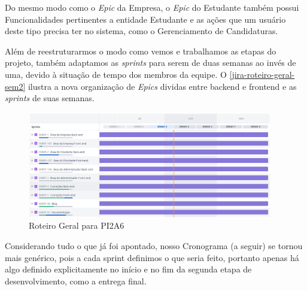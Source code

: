 Do mesmo modo como o \textit{Epic} da Empresa, o \textit{Epic} do Estudante também possui Funcionalidades pertinentes a entidade Estudante e as ações que um usuário deste tipo precisa ter no sistema, como o Gerenciamento de Candidaturas.

Além de reestruturarmos o modo como vemos e trabalhamos as etapas do projeto, também adaptamos as \textit{\glspl{sprint}} para serem de duas semanas ao invés de uma, devido à situação de tempo dos membros da equipe. O \autoref{jira-roteiro-geral-sem2} ilustra a nova organização de \textit{Epics} dividas entre \gls{backend} e \gls{frontend} e as \textit{\glspl{sprint}} de suas semanas.

\begin{figure}[H]
	\centering
	\caption{\label{jira-roteiro-geral-sem2}Roteiro Geral para PI2A6}
	\includegraphics[width=0.95\textwidth]{../imagens/jira-roteiro-geral-sem2.png}
\end{figure}

Considerando tudo o que já foi apontado, nosso Cronograma (a seguir) se tornou mais genérico, pois a cada \gls{sprint} definimos o que seria feito, portanto apenas há algo definido explicitamente no início e no fim da segunda etapa de desenvolvimento, como a entrega final.

